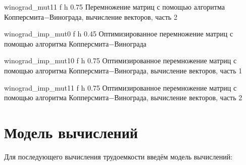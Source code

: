 {winograd_mut11} %
{f} %
{h} %
{0.75\textwidth} %
{Перемножение матриц с помощью алгоритма Копперсмита$-$Винограда, вычисление векторов, часть 2} %
\clearpage

{winograd_imp_mut0} %
{f} %
{h} %
{0.45\textwidth} %
{Оптимизированное перемножение матриц с помощью алгоритма Копперсмита$-$Винограда} %
\clearpage

{winograd_imp_mut10} %
{f} %
{h} %
{0.75\textwidth} %
{Оптимизированное перемножение матриц с помощью алгоритма Копперсмита$-$Винограда, вычисление векторов, часть 1} %
\clearpage

{winograd_imp_mut11} %
{f} %
{h} %
{0.75\textwidth} %
{Оптимизированное перемножение матриц с помощью алгоритма Копперсмита$-$Винограда, вычисление векторов, часть 2} %
\clearpage

\section{Модель вычислений}

Для последующего вычисления трудоемкости введём модель вычислений:

